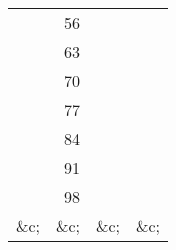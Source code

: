 \documentclass[12pt,preview]{standalone}
\begin{document}
\begin{minipage}{\textwidth}
\begin{center}
\begin{tabular}{ |c|c|c|c| }
            \multicolumn{1}{|r|}{{\color{cred}{64}}}  & \multicolumn{1}{|r|}{56}   & \multicolumn{1}{|r|}{{\color{cblue}{80}}}  & \multicolumn{1}{|r|}{{\color{cyellow}{72}}}  \\
            \multicolumn{1}{|r|}{{\color{cred}{72}}}  & \multicolumn{1}{|r|}{63}   & \multicolumn{1}{|r|}{{\color{cblue}{90}}}  & \multicolumn{1}{|r|}{{\color{cyellow}{81}}}  \\
            \multicolumn{1}{|r|}{{\color{cred}{80}}}  & \multicolumn{1}{|r|}{70}   & \multicolumn{1}{|r|}{{\color{cblue}{100}}} & \multicolumn{1}{|r|}{{\color{cyellow}{90}}}  \\
            \multicolumn{1}{|r|}{{\color{cred}{88}}}  & \multicolumn{1}{|r|}{77}   & \multicolumn{1}{|r|}{{\color{cblue}{110}}} & \multicolumn{1}{|r|}{{\color{cyellow}{99}}}  \\
            \multicolumn{1}{|r|}{{\color{cred}{96}}}  & \multicolumn{1}{|r|}{84}   & \multicolumn{1}{|r|}{{\color{cblue}{120}}} & \multicolumn{1}{|r|}{{\color{cyellow}{108}}} \\
            \multicolumn{1}{|r|}{{\color{cred}{104}}} & \multicolumn{1}{|r|}{91}   & \multicolumn{1}{|r|}{{\color{cblue}{130}}} & \multicolumn{1}{|r|}{{\color{cyellow}{117}}} \\
            \multicolumn{1}{|r|}{{\color{cred}{112}}} & \multicolumn{1}{|r|}{98}   & \multicolumn{1}{|r|}{{\color{cblue}{140}}} & \multicolumn{1}{|r|}{{\color{cyellow}{126}}} \\
            \multicolumn{1}{|r|}{\&c;}                & \multicolumn{1}{|r|}{\&c;} & \multicolumn{1}{|r|}{\&c;}                 & \multicolumn{1}{|r|}{\&c;}                   \\
            \hline
        \end{tabular}
    \end{center}

    \hfill

    \hfill


\end{minipage}
\end{document}
